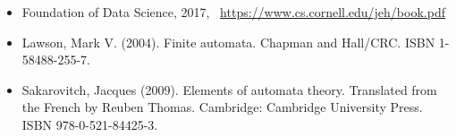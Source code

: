 \documentclass{article}
\begin{document}
\begin{itemize}\itemsep .125cm
	\item Foundation of Data Science, 2017, ~\url{https://www.cs.cornell.edu/jeh/book.pdf}
	\item Lawson, Mark V. (2004). Finite automata. Chapman and Hall/CRC. ISBN 1-58488-255-7. 
	\item Sakarovitch, Jacques (2009). Elements of automata theory. Translated from the French by Reuben Thomas. Cambridge: Cambridge University Press. ISBN 978-0-521-84425-3. 
	
\end{itemize}

\ifx\onefile\undefined
	
\end{document}
